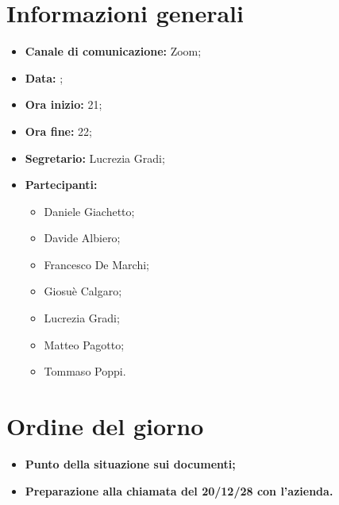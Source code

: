 \section{Informazioni generali}

\begin{itemize}

	\item \textbf{Canale di comunicazione:} Zoom;
	
	\item \textbf{Data:} \DataMeeting{};
	
	\item \textbf{Ora inizio:} 21;
	
	\item \textbf{Ora fine:} 22;
	
	\item \textbf{Segretario:} Lucrezia Gradi;
	
	\item \textbf{Partecipanti:}
	
		\begin{itemize}
		
			\item Daniele Giachetto;
			\item Davide Albiero;
			\item Francesco De Marchi;
			\item Giosuè Calgaro;
			\item Lucrezia Gradi;
			\item Matteo Pagotto;
			\item Tommaso Poppi.
				 
		\end{itemize}

\end{itemize}

\section{Ordine del giorno}

\begin{itemize}

	\item\textbf{Punto della situazione sui documenti;}
	
	\item\textbf{Preparazione alla chiamata del 20/12/28 con l'azienda.}

\end{itemize}

\newpage


